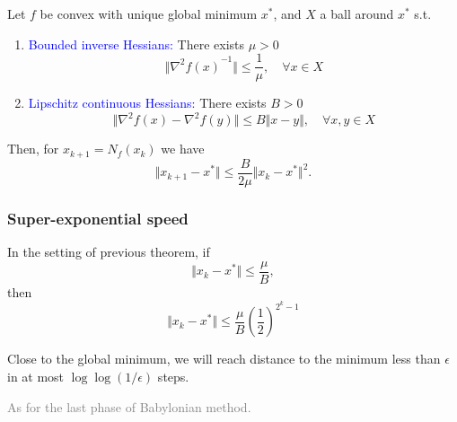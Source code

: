 \documentclass[aspectratio=149]{beamer}
\begin{document}
\begin{frame}
  \begin{theorem}
    Let $f$ be convex with unique global minimum $x^*$, and $X$ a ball around $x^*$ s.t.
    \begin{enumerate}
      \item \textcolor{blue}{Bounded inverse Hessians:} There exists $\mu > 0$
            \begin{equation}
              \Vert {\nabla^2 f(x)}^{-1} \Vert \le \frac{1}{\mu}, \quad \forall x \in X
            \end{equation}
      \item \textcolor{blue}{Lipschitz continuous Hessians:} There exists $B>0$
            \begin{equation}
              \Vert \nabla^2 f(x) - \nabla^2 f(y) \Vert \le B \Vert x-y \Vert, \quad \forall x,y \in X
            \end{equation}
    \end{enumerate}
    Then, for $x_{k+1} = N_f(x_k)$ we have
    \begin{equation}
      \Vert x_{k+1} -x^* \Vert \le \frac{B}{2 \mu} \Vert x_k - x^* \Vert^2.
    \end{equation}
  \end{theorem}
\end{frame}


\begin{frame}
  \frametitle{Super-exponential speed}
  \begin{corollary}%
    In the setting of previous theorem, if
    \begin{equation}
      \Vert x_k - x^* \Vert \le \frac{\mu}{B},
    \end{equation}
    then
    \begin{equation}
      \Vert x_k -x^*  \Vert \le \frac{\mu}{B} {\left( \frac{1}{2} \right)}^{2^k-1}
    \end{equation}
  \end{corollary}
  Close to the global minimum, we will reach distance to the minimum less than $\epsilon$ in at most $\log \log (1/\epsilon)$ steps.

  \textcolor{gray}{As for the last phase of Babylonian method.}
\end{frame}
\end{document}

